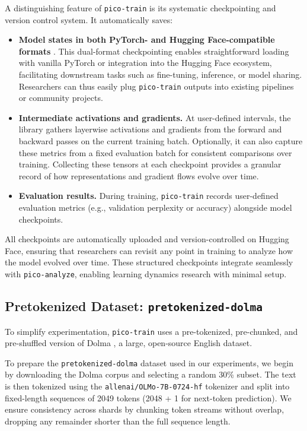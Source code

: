 A distinguishing feature of \texttt{pico-train} is its systematic checkpointing and version control system. It automatically saves:
\begin{itemize}
    \item \textbf{Model states in both PyTorch- and Hugging Face-compatible formats} \citep{huggingface}. This dual-format checkpointing enables straightforward loading with vanilla PyTorch or integration into the Hugging Face ecosystem, facilitating downstream tasks such as fine-tuning, inference, or model sharing. Researchers can thus easily plug \texttt{pico-train} outputs into existing pipelines or community projects.

    \item \textbf{Intermediate activations and gradients.} At user-defined intervals, the library gathers layerwise activations and gradients from the forward and backward passes on the current training batch. Optionally, it can also capture these metrics from a fixed evaluation batch for consistent comparisons over training. Collecting these tensors at each checkpoint provides a granular record of how representations and gradient flows evolve over time.

    \item \textbf{Evaluation results.} During training, \texttt{pico-train} records user-defined evaluation metrics (e.g., validation perplexity or accuracy) alongside model checkpoints.
\end{itemize}
\vspace{-0.2em}
All checkpoints are automatically uploaded and version-controlled on Hugging Face, ensuring that researchers can revisit any point in training to analyze how the model evolved over time. These structured checkpoints integrate seamlessly with \texttt{pico-analyze}, enabling learning dynamics research with minimal setup.

\subsection{Pretokenized Dataset: \texttt{pretokenized-dolma}}

To simplify experimentation, \texttt{pico-train} uses a pre-tokenized, pre-chunked, and pre-shuffled version of Dolma \citep{soldaini2024dolma}, a large, open-source English dataset. 

To prepare the \texttt{pretokenized-dolma} dataset used in our experiments, we begin by downloading the Dolma corpus and selecting a random 30\% subset. The text is then tokenized using the \verb|allenai/OLMo-7B-0724-hf| tokenizer and split into fixed-length sequences of 2049 tokens (2048 + 1 for next-token prediction). We ensure consistency across shards by chunking token streams without overlap, dropping any remainder shorter than the full sequence length.

